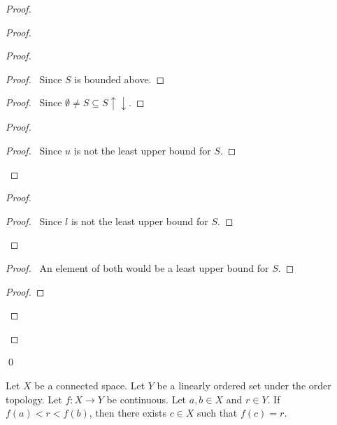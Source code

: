 \begin{proof}
\begin{proof}
\begin{proof}
		\begin{proof}
			\pf\ Since $S$ is bounded above.
		\end{proof}
		\begin{proof}
			\pf\ Since $\emptyset \neq S \subseteq S \uparrow \downarrow$.
		\end{proof}
		\begin{proof}
			\begin{proof}
				\pf\ Since $u$ is not the least upper bound for $S$.
			\end{proof}
		\end{proof}
		\begin{proof}
			\begin{proof}
				\pf\ Since $l$ is not the least upper bound for $S$.
			\end{proof}
		\end{proof}
		\begin{proof}
			\pf\ An element of both would be a least upper bound for $S$.
		\end{proof}
		\begin{proof}
		\end{proof}
	\end{proof}
\end{proof}
\qed
\end{proof}

\begin{thm}
Let $X$ be a connected space. Let $Y$ be a linearly ordered set under the order topology. Let $f : X \rightarrow Y$ be continuous. Let $a, b \in X$ and $r \in Y$. If $f(a) < r < f(b)$, then there exists $c \in X$ such that $f(c) = r$.
\end{thm}

